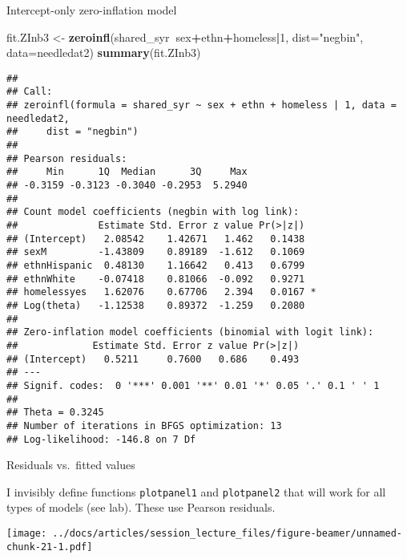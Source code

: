 \documentclass[
  ignorenonframetext,
]{beamer}
\newenvironment{Shaded}{\begin{snugshade}}{\end{snugshade}}
\newcommand{\DataTypeTok}[1]{\textcolor[rgb]{0.13,0.29,0.53}{#1}}
\newcommand{\DecValTok}[1]{\textcolor[rgb]{0.00,0.00,0.81}{#1}}
\newcommand{\KeywordTok}[1]{\textcolor[rgb]{0.13,0.29,0.53}{\textbf{#1}}}
\newcommand{\NormalTok}[1]{#1}
\newcommand{\OperatorTok}[1]{\textcolor[rgb]{0.81,0.36,0.00}{\textbf{#1}}}
\newcommand{\StringTok}[1]{\textcolor[rgb]{0.31,0.60,0.02}{#1}}
\begin{document}
\begin{frame}[fragile]{Intercept-only zero-inflation model}
\protect\hypertarget{intercept-only-zero-inflation-model}{}

\tiny

\begin{Shaded}
\begin{Highlighting}[]
\NormalTok{fit.ZInb3 <-}\StringTok{ }\KeywordTok{zeroinfl}\NormalTok{(shared_syr}\OperatorTok{~}\NormalTok{sex}\OperatorTok{+}\NormalTok{ethn}\OperatorTok{+}\NormalTok{homeless}\OperatorTok{|}\DecValTok{1}\NormalTok{, }
                        \DataTypeTok{dist=}\StringTok{"negbin"}\NormalTok{, }\DataTypeTok{data=}\NormalTok{needledat2)}
\KeywordTok{summary}\NormalTok{(fit.ZInb3)}
\end{Highlighting}
\end{Shaded}

\begin{verbatim}
## 
## Call:
## zeroinfl(formula = shared_syr ~ sex + ethn + homeless | 1, data = needledat2, 
##     dist = "negbin")
## 
## Pearson residuals:
##     Min      1Q  Median      3Q     Max 
## -0.3159 -0.3123 -0.3040 -0.2953  5.2940 
## 
## Count model coefficients (negbin with log link):
##              Estimate Std. Error z value Pr(>|z|)  
## (Intercept)   2.08542    1.42671   1.462   0.1438  
## sexM         -1.43809    0.89189  -1.612   0.1069  
## ethnHispanic  0.48130    1.16642   0.413   0.6799  
## ethnWhite    -0.07418    0.81066  -0.092   0.9271  
## homelessyes   1.62076    0.67706   2.394   0.0167 *
## Log(theta)   -1.12538    0.89372  -1.259   0.2080  
## 
## Zero-inflation model coefficients (binomial with logit link):
##             Estimate Std. Error z value Pr(>|z|)
## (Intercept)   0.5211     0.7600   0.686    0.493
## ---
## Signif. codes:  0 '***' 0.001 '**' 0.01 '*' 0.05 '.' 0.1 ' ' 1 
## 
## Theta = 0.3245 
## Number of iterations in BFGS optimization: 13 
## Log-likelihood: -146.8 on 7 Df
\end{verbatim}

\end{frame}

\begin{frame}[fragile]{Residuals vs.~fitted values}
\protect\hypertarget{residuals-vs.-fitted-values}{}

I invisibly define functions \texttt{plotpanel1} and \texttt{plotpanel2}
that will work for all types of models (see lab). These use Pearson
residuals.

\texttt{[image: ../docs/articles/session\_lecture\_files/figure-beamer/unnamed-chunk-21-1.pdf]}

\end{frame}
\end{document}
